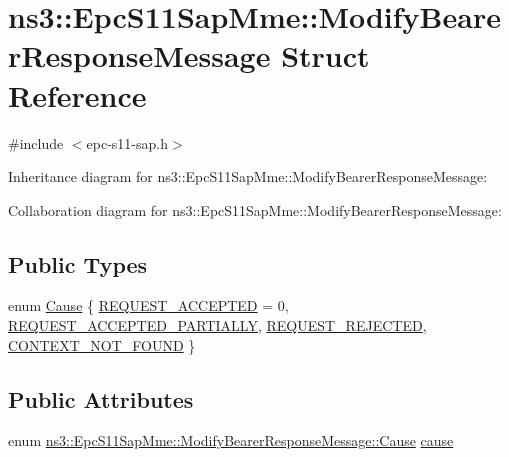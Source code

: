 \hypertarget{structns3_1_1EpcS11SapMme_1_1ModifyBearerResponseMessage}{}\section{ns3\+:\+:Epc\+S11\+Sap\+Mme\+:\+:Modify\+Bearer\+Response\+Message Struct Reference}
\label{structns3_1_1EpcS11SapMme_1_1ModifyBearerResponseMessage}


{\ttfamily \#include $<$epc-\/s11-\/sap.\+h$>$}



Inheritance diagram for ns3\+:\+:Epc\+S11\+Sap\+Mme\+:\+:Modify\+Bearer\+Response\+Message\+:


Collaboration diagram for ns3\+:\+:Epc\+S11\+Sap\+Mme\+:\+:Modify\+Bearer\+Response\+Message\+:
\subsection*{Public Types}
\begin{DoxyCompactItemize}
\item 
enum \hyperlink{structns3_1_1EpcS11SapMme_1_1ModifyBearerResponseMessage_a0f5caf9b54d24e8298ba8878ef1f773c}{Cause} \{ \hyperlink{structns3_1_1EpcS11SapMme_1_1ModifyBearerResponseMessage_a0f5caf9b54d24e8298ba8878ef1f773ca13e4573acd6716004d421a969b43e50c}{R\+E\+Q\+U\+E\+S\+T\+\_\+\+A\+C\+C\+E\+P\+T\+ED} = 0, 
\hyperlink{structns3_1_1EpcS11SapMme_1_1ModifyBearerResponseMessage_a0f5caf9b54d24e8298ba8878ef1f773ca73c07b9b8c5ba9de1558a0bec1176414}{R\+E\+Q\+U\+E\+S\+T\+\_\+\+A\+C\+C\+E\+P\+T\+E\+D\+\_\+\+P\+A\+R\+T\+I\+A\+L\+LY}, 
\hyperlink{structns3_1_1EpcS11SapMme_1_1ModifyBearerResponseMessage_a0f5caf9b54d24e8298ba8878ef1f773cab93903d59b004b153b492dc311225bcd}{R\+E\+Q\+U\+E\+S\+T\+\_\+\+R\+E\+J\+E\+C\+T\+ED}, 
\hyperlink{structns3_1_1EpcS11SapMme_1_1ModifyBearerResponseMessage_a0f5caf9b54d24e8298ba8878ef1f773ca05fc357c13bfaba117331bb759176f4a}{C\+O\+N\+T\+E\+X\+T\+\_\+\+N\+O\+T\+\_\+\+F\+O\+U\+ND}
 \}
\end{DoxyCompactItemize}
\subsection*{Public Attributes}
\begin{DoxyCompactItemize}
\item 
enum \hyperlink{structns3_1_1EpcS11SapMme_1_1ModifyBearerResponseMessage_a0f5caf9b54d24e8298ba8878ef1f773c}{ns3\+::\+Epc\+S11\+Sap\+Mme\+::\+Modify\+Bearer\+Response\+Message\+::\+Cause} \hyperlink{structns3_1_1EpcS11SapMme_1_1ModifyBearerResponseMessage_a2b554ce8ee8f5fd4ba1752c850335860}{cause}
\end{DoxyCompactItemize}


